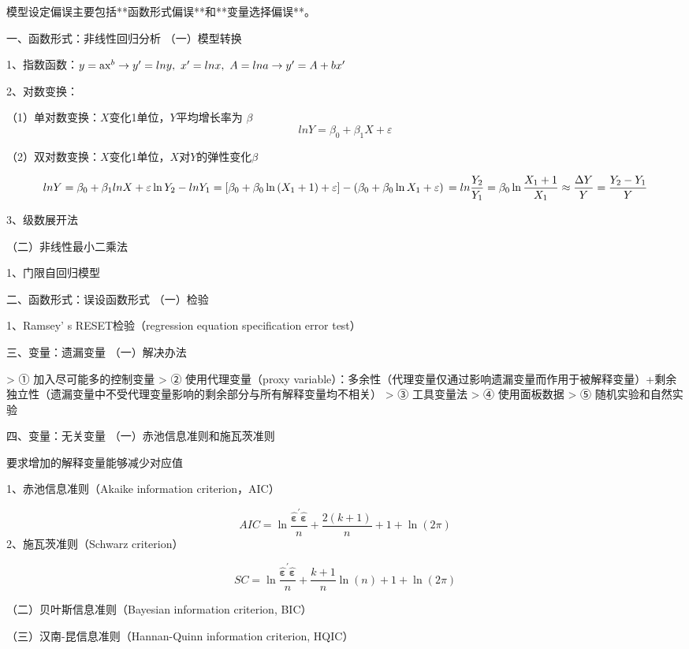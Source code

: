 \documentclass[12pt]{book}
\begin{document}
模型设定偏误主要包括**函数形式偏误**和**变量选择偏误**。

一、函数形式：非线性回归分析
（一）模型转换

1、指数函数：$y={\rm ax}^b\rightarrow y^\prime=lny,\ x^\prime=lnx,\ A=lna\rightarrow y^\prime=A+bx^\prime$

2、对数变换：

（1）单对数变换：$X$变化1单位，$Y$平均增长率为 $β$
$$
lnY=\beta_0+\beta_1X+\varepsilon
$$

（2）双对数变换：$X$变化1单位，$X$对$Y$的弹性变化$β$

$$
lnY=\beta_0+\beta_1lnX+\varepsilon\\ \ln{Y_2}-lnY_1 
=\left[\beta_0+\beta_0\ln{\left(X_1+1\right)}+\varepsilon\right]-\left(\beta_0+\beta_0\ln{X_1}+\varepsilon\right)\\ 
=ln\frac{Y_2}{Y_1} =\beta_0\ln{\frac{X_1+1}{X_1}}\\ 
\approx\frac{\Delta Y}{Y} =\frac{Y_2-Y_1}{Y} \\
$$

3、级数展开法

（二）非线性最小二乘法

1、门限自回归模型

 二、函数形式：误设函数形式
（一）检验

1、Ramsey' s RESET检验（regression equation specification error test）

三、变量：遗漏变量
（一）解决办法

> ① 加入尽可能多的控制变量  
> ② 使用代理变量（proxy variable）：多余性（代理变量仅通过影响遗漏变量而作用于被解释变量）+剩余独立性（遗漏变量中不受代理变量影响的剩余部分与所有解释变量均不相关）  
> ③ 工具变量法  
> ④ 使用面板数据  
> ⑤ 随机实验和自然实验

四、变量：无关变量
（一）赤池信息准则和施瓦茨准则

要求增加的解释变量能够减少对应值

1、赤池信息准则（Akaike information criterion，AIC）

$$
AIC = \ln{ \frac{{\hat{\bm{\varepsilon}}}^\prime\hat{\bm{\varepsilon}}}{n} }+\frac{2(k+1)}{n} + 1 + \ln(2\pi)
$$
2、施瓦茨准则（Schwarz criterion）

$$
SC = \ln{\frac{{ \hat{ \bm{\varepsilon} }}^\prime\hat{\bm{\varepsilon}}}{n}}+\frac{k+1}{n} \ln{(n)} + 1 + \ln{(2\pi)} 
$$

（二）贝叶斯信息准则（Bayesian information criterion, BIC）

（三）汉南-昆信息准则（Hannan-Quinn information criterion, HQIC）
\end{document}
